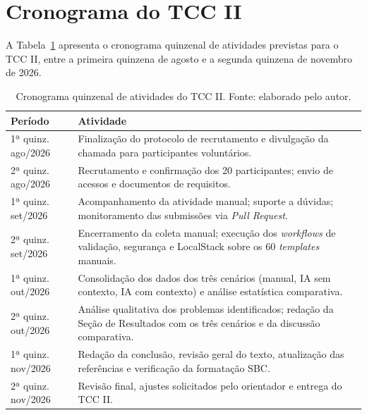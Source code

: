 \appendix

\section{Cronograma do TCC II}
\label{apx:cronograma}

A Tabela~\ref{tab:cronograma} apresenta o cronograma quinzenal de atividades previstas para o TCC II, entre a primeira quinzena de agosto e a segunda quinzena de novembro de 2026.

\begin{table}[H]
\centering
\caption{Cronograma quinzenal de atividades do TCC II. Fonte: elaborado pelo autor.}
\label{tab:cronograma}
\begin{tabularx}{\textwidth}{>{\raggedright\arraybackslash}p{2.6cm}|>{\raggedright\arraybackslash}X}
\hline
\textbf{Período} & \textbf{Atividade} \\
\hline
1ª quinz. ago/2026 & Finalização do protocolo de recrutamento e divulgação da chamada para participantes voluntários. \\
\hline
2ª quinz. ago/2026 & Recrutamento e confirmação dos 20 participantes; envio de acessos e documentos de requisitos. \\
\hline
1ª quinz. set/2026 & Acompanhamento da atividade manual; suporte a dúvidas; monitoramento das submissões via \textit{Pull Request}. \\
\hline
2ª quinz. set/2026 & Encerramento da coleta manual; execução dos \textit{workflows} de validação, segurança e LocalStack sobre os 60 \textit{templates} manuais. \\
\hline
1ª quinz. out/2026 & Consolidação dos dados dos três cenários (manual, IA sem contexto, IA com contexto) e análise estatística comparativa. \\
\hline
2ª quinz. out/2026 & Análise qualitativa dos problemas identificados; redação da Seção de Resultados com os três cenários e da discussão comparativa. \\
\hline
1ª quinz. nov/2026 & Redação da conclusão, revisão geral do texto, atualização das referências e verificação da formatação SBC. \\
\hline
2ª quinz. nov/2026 & Revisão final, ajustes solicitados pelo orientador e entrega do TCC II. \\
\hline
\end{tabularx}
\end{table}
